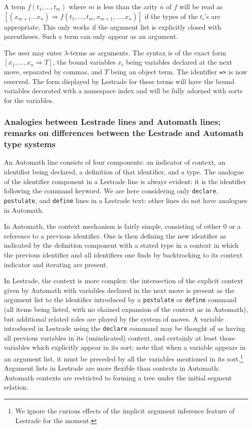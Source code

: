 \documentclass[12pt]{article}
\begin{document}
\begin{description}
A term $f(t_1,\ldots,t_m)$ where $m$ is less than the arity $n$ of $f$ will be read as $[(x_{m+1}\ldots x_n) \Rightarrow f(t_1,\ldots,t_m,x_{m+1},\dots,x_n)]$ if the types of the $t_i$'s are appropriate.  This only works if the argument list is explicitly closed with parentheses.  Such a term can only appear as an argument.

The user may enter $\lambda$-terms as arguments.  The syntax is of the exact form $[x_1,\ldots,x_n \Rightarrow T]$, the bound variables $x_i$ being variables declared at the next move, separated by commas, and $T$ being an object term.  The identifier {\tt =>} is now reserved.  The form displayed by Lestrade for these terms will have the bound variables decorated with a namespace index and will be fully adorned with sorts for the variables.

\end{description}

\newpage 

\subsubsection{Analogies between Lestrade lines and Automath lines; remarks on differences between the Lestrade and Automath type systems}

An Automath line consists of four components:  an indicator of context, an identifier being declared, a definition of that identifier, and a type.  The analogue of the identifier component in a Lestrade line is always evident:  it is the identifier following the command keyword.  We are here considering only {\tt declare}, {\tt postulate}, and {\tt define} lines in
a Lestrade text:  other lines do not have analogues in Automath.

In Automath, the context mechanism is fairly simple, consisting of either 0 or a reference to a previous identifier.  One is then defining the new identifier as
indicated by the definition component with a stated type in a context in which the previous identifier and all identifiers one finds by backtracking to its context indicator and iterating are present.

In Lestrade, the context is more complex:  the intersection of the explicit context given by Automath with variables declared in the next move  is present as the argument list to the identifier introduced by a  {\tt postulate} or {\tt define} command (all items being listed, with no chained expansion of the context as in Automath), but additional related roles are played by the system of moves.  A variable introduced in Lestrade using the {\tt declare}
command may be thought of as having all previous variables in its (unindicated) context, and certainly at least those variables which explicitly appear in its sort:  note that when a variable appears in an argument list, it must be preceded by all the variables mentioned in its sort.\footnote{We ignore the curious effects of the implicit argument inference feature of Lestrade for the  moment.}  Argument lists in Lestrade are more flexible than contexts in Automath:  Automath contexts are restricted to forming a tree under the initial segment relation.
\end{document}
